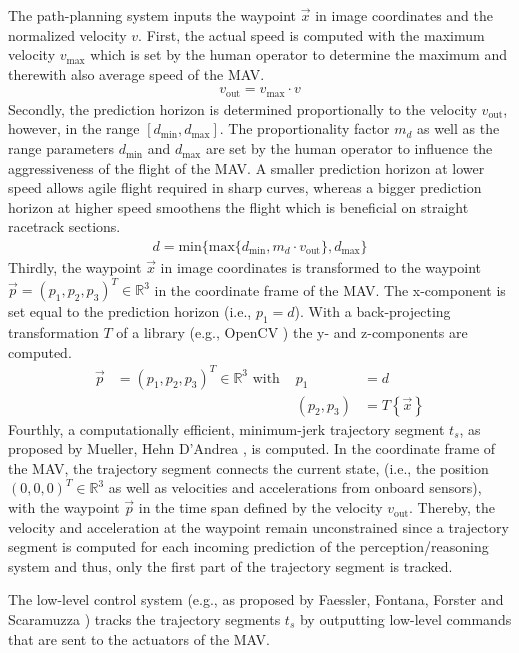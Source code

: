 The path-planning system inputs the waypoint $\vec x$ in image coordinates and the normalized velocity $v$.
First, the actual speed is computed with the maximum velocity $v_{\text{max}}$ which is set by the human operator 
to determine the maximum and therewith also average speed of the MAV.
\begin{align}
    v_{\text{out}} = v_{\text{max}} \cdot v
\end{align}
Secondly, the prediction horizon is determined proportionally to the velocity $v_{\text{out}}$,
however, in the range $[d_\text{min}, d_\text{max}]$.
The proportionality factor $m_d$ as well as the range parameters $d_\text{min}$ and $d_\text{max}$
are set by the human operator to influence the aggressiveness of the flight of the MAV.
A smaller prediction horizon at lower speed allows agile flight required in sharp curves,
whereas a bigger prediction horizon at higher speed smoothens the flight which is beneficial on straight racetrack sections.
\begin{align}
    d = \text{min} \{\text{max}\{d_\text{min}, m_d \cdot v_{\text{out}}\}, d_\text{max}\} 
\end{align}
Thirdly, the waypoint $\vec x$ in image coordinates 
is transformed to the waypoint $\vec p = (p_1, p_2, p_3)^T \in \mathbb{R}^3$ in the coordinate frame of the MAV.
The x-component is set equal to the prediction horizon (i.e., $p_1 = d$).
With a back-projecting transformation $T$ of a library (e.g., OpenCV \cite{OpenCV}) the y- and z-components are computed.
\begin{align}
    \vec p &= (p_1, p_2, p_3)^T \in \mathbb{R}^3 \text{ with } & p_1 &= d \nonumber \\
    && (p_2,  p_3)  & = T\left\{ \vec x\right\}
\end{align}
Fourthly, a computationally efficient, minimum-jerk trajectory segment $t_s$, 
as proposed by Mueller, Hehn D'Andrea \cite{Mueller2013}, is computed.
In the coordinate frame of the MAV, the trajectory segment connects the current state, 
(i.e., the position $(0, 0, 0)^T \in \mathbb{R}^3$ as well as velocities and accelerations from onboard sensors),
with the waypoint $\vec p$ in the time span defined by the velocity $v_\text{out}$.
Thereby, the velocity and acceleration at the waypoint remain unconstrained since 
a trajectory segment is computed for each incoming prediction of the perception/reasoning system
and thus, only the first part of the trajectory segment is tracked.

The low-level control system (e.g., as proposed by Faessler, Fontana, Forster and Scaramuzza \cite{Faessler2015}) 
tracks the trajectory segments $t_s$ by outputting low-level commands that are sent to the actuators of the MAV.

